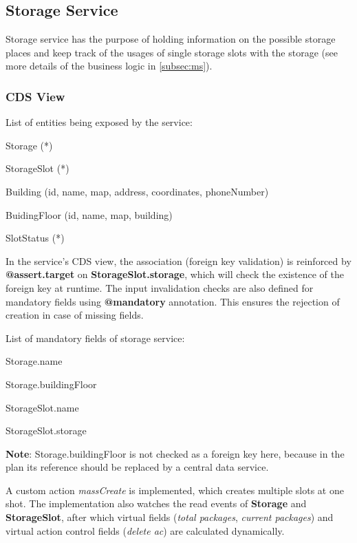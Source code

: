 \subsection{Storage Service}
\label{subsec:back-ms}

Storage service has the purpose of holding information on the possible storage places and keep track of the usages of single storage slots with the storage (see more details of the business logic in \autoref{subsec:ms}). 

\subsubsection{CDS View}

\noindent
List of entities being exposed by the service:
\begin{compactenum}
	\item Storage (*)
    \item StorageSlot (*)
    \item Building (id, name, map, address, coordinates, phoneNumber)
    \item BuidingFloor (id, name, map, building)
    \item SlotStatus (*)
\end{compactenum}

\bigskip
In the service's CDS view, the association (foreign key validation) is reinforced by \textbf{@assert.target} on \textbf{StorageSlot.storage}, which will check the existence of the foreign key at runtime.
 The input invalidation checks are also defined for mandatory fields using \textbf{@mandatory} annotation. This ensures the rejection of creation in case of missing fields.

\bigskip
\noindent
List of mandatory fields of storage service:
\begin{compactenum}
	\item Storage.name
    \item Storage.buildingFloor
    \item StorageSlot.name
    \item StorageSlot.storage
\end{compactenum}

\bigskip
\textbf{Note}: Storage.buildingFloor is not checked as a foreign key here, because in the plan its reference should be replaced by a central data service.


A custom action \textit{massCreate} is implemented, which creates multiple slots at one shot. The implementation also watches the read events of \textbf{Storage} and \textbf{StorageSlot}, after which virtual fields (\textit{total packages}, \textit{current packages}) and virtual action control fields (\textit{delete ac}) are calculated dynamically.

